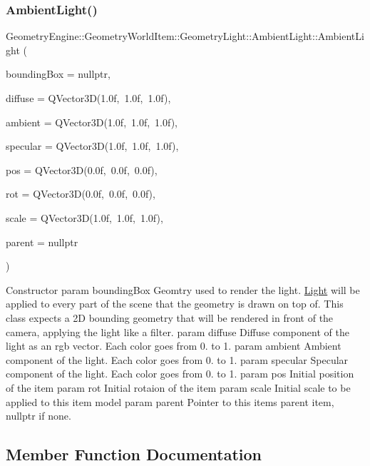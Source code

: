 \subsubsection{\texorpdfstring{AmbientLight()}{AmbientLight()}}
{\footnotesize\ttfamily Geometry\+Engine\+::\+Geometry\+World\+Item\+::\+Geometry\+Light\+::\+Ambient\+Light\+::\+Ambient\+Light (\begin{DoxyParamCaption}\item[{\mbox{\hyperlink{class_geometry_engine_1_1_geometry_world_item_1_1_geometry_item_1_1_geometry_item}{Geometry\+Item\+::\+Geometry\+Item}} $\ast$}]{bounding\+Box = {\ttfamily nullptr},  }\item[{const Q\+Vector3D \&}]{diffuse = {\ttfamily QVector3D(1.0f,~1.0f,~1.0f)},  }\item[{const Q\+Vector3D \&}]{ambient = {\ttfamily QVector3D(1.0f,~1.0f,~1.0f)},  }\item[{const Q\+Vector3D \&}]{specular = {\ttfamily QVector3D(1.0f,~1.0f,~1.0f)},  }\item[{const Q\+Vector3D \&}]{pos = {\ttfamily QVector3D(0.0f,~0.0f,~0.0f)},  }\item[{const Q\+Vector3D \&}]{rot = {\ttfamily QVector3D(0.0f,~0.0f,~0.0f)},  }\item[{const Q\+Vector3D \&}]{scale = {\ttfamily QVector3D(1.0f,~1.0f,~1.0f)},  }\item[{\mbox{\hyperlink{class_geometry_engine_1_1_geometry_world_item_1_1_world_item}{World\+Item}} $\ast$}]{parent = {\ttfamily nullptr} }\end{DoxyParamCaption})}

Constructor param bounding\+Box Geomtry used to render the light. \mbox{\hyperlink{class_geometry_engine_1_1_geometry_world_item_1_1_geometry_light_1_1_light}{Light}} will be applied to every part of the scene that the geometry is drawn on top of. This class expects a 2D bounding geometry that will be rendered in front of the camera, applying the light like a filter. param diffuse Diffuse component of the light as an rgb vector. Each color goes from 0. to 1. param ambient Ambient component of the light. Each color goes from 0. to 1. param specular Specular component of the light. Each color goes from 0. to 1. param pos Initial position of the item param rot Initial rotaion of the item param scale Initial scale to be applied to this item model param parent Pointer to this items parent item, nullptr if none. 

\subsection{Member Function Documentation}
\mbox{\label{class_geometry_engine_1_1_geometry_world_item_1_1_geometry_light_1_1_ambient_light_a4f1d4fb9ad25626e15c28de03b610b4f}} 
